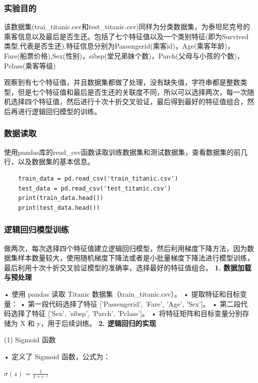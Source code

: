 \documentclass[12pt,a4paper,oneside]{article}
\begin{document}
\subsubsection{实验目的}

\qquad 该数据集(trai\_titanic.csv和test\_titanic.csv)同样为分类数据集，为泰坦尼克号的乘客信息以及最后是否生还。包括了七个特征值以及一个类别特征(即为Survived类型,代表是否生还),特征信息分别为Passengerid(乘客id)，Age(乘客年龄)，Fare(船票价格),Sex(性别)，sibsp(堂兄弟妹个数)，Parch(父母与小孩的个数)，Pclass(乘客等级)

观察到有七个特征值，并且数据集都做了处理，没有缺失值，字符串都是整数类型，但是七个特征值和最后是否生还的关联度不同，所以可以选择两次，每一次随机选择四个特征值，然后进行十次十折交叉验证，最后得到最好的特征值组合，然后再进行逻辑回归模型的训练。

\subsubsection{数据读取}
\qquad 使用pandas库的read\_csv函数读取训练数据集和测试数据集，查看数据集的前几行，以及数据集的基本信息。
\begin{lstlisting}
    train_data = pd.read_csv('train_titanic.csv')
    test_data = pd.read_csv('test_titanic.csv')
    print(train_data.head())
    print(test_data.head())
\end{lstlisting}

\subsubsection{逻辑回归模型训练}

\qquad 做两次，每次选择四个特征值建立逻辑回归模型，然后利用梯度下降方法，因为数据集样本数量较大，使用随机梯度下降法或者是小批量梯度下降法进行模型训练，最后利用十次十折交叉验证模型的准确率，选择最好的特征值组合。
\newline\textbf{1. 数据加载与预处理}

	•	使用 pandas 读取 Titanic 数据集（train\_titanic.csv）。
	•	提取特征和目标变量：
	•	第一段代码选择了特征 ['Passengerid', 'Fare', 'Age', 'Sex']。
	•	第二段代码选择了特征 ['Sex', 'sibsp', 'Parch', 'Pclass']。
	•	将特征矩阵和目标变量分别存储为 X 和 y，用于后续训练。
    \newline\textbf{2. 逻辑回归的实现}

(1) Sigmoid 函数

	•	定义了 Sigmoid 函数，公式为：

$\sigma(z) = \frac{1}{1 + e^{-z}}$
\end{document}

